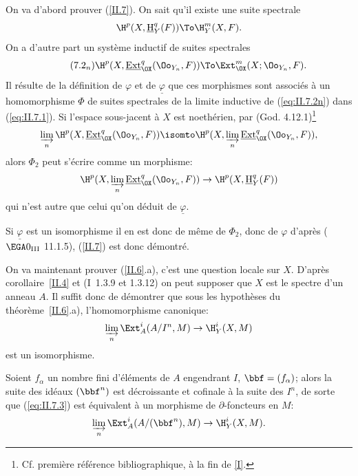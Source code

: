 On va d'abord prouver (\ref{II.7}). On sait qu'il existe une suite spectrale
\begin{equation} \label{eq:II.7.1}
\H^p(X, {\mathop{\underline{\mathrm{H}}}\nolimits}_Y^q(F)) \To \H_Y^{m}(X, F).
\end{equation}
On a d'autre part un syst\`eme inductif de suites spectrales
\begin{equation*} \label{eq:II.7.2n} \tag{7.2$_n$}
\H^p(X, {\mathop{\underline{\mathrm{Ext}}}\nolimits}_{\OX}^q(\Oo_{Y_n}, F)) \To \Ext_{\OX}^{m}(X;\Oo_{Y_n}, F).
\end{equation*}
Il r\'esulte de la d\'efinition de $\varphi$ et de $\underline{\varphi}$ que ces morphismes sont associ\'es \`a un homomorphisme $\Phi$ de suites spectrales de la limite inductive de (\ref{eq:II.7.2n}) dans (\ref{eq:II.7.1}). Si l'espace sous-jacent \`a $X$ est noeth\'erien, par (God. 4.12.1)\footnote{Cf. premi\`ere r\'ef\'erence bibliographique, \`a la fin de \Exp \ref{I}.}
\begin{equation*}
\varinjlim_{n} \H^p(X, {\mathop{\underline{\mathrm{Ext}}}\nolimits}_{\OX}^q(\Oo_{Y_n}, F))\isomto \H^p(X, \varinjlim_{n} {\mathop{\underline{\mathrm{Ext}}}\nolimits}_{\OX}^q(\Oo_{Y_n}, F)),
\end{equation*}
alors $\Phi_2$ peut s'\'ecrire comme un morphisme:
\begin{equation*} \H^p(X, \varinjlim_{n} {\mathop{\underline{\mathrm{Ext}}}\nolimits}_{\OX}^q(\Oo_{Y_n}, F)) \to \H^p(X, {\mathop{\underline{\mathrm{H}}}\nolimits}_Y^q(F))
\end{equation*}
qui n'est autre que celui qu'on d\'eduit de $\underline{\varphi}$.

Si $\underline{\varphi}$ est un isomorphisme il en est donc de m\^eme de $\Phi_2$, donc de $\varphi$ d'apr\`es ($\EGA 0_{\textup{III}}$ 11.1.5), (\ref{II.7}) est donc d\'emontr\'e.

On va maintenant prouver (\ref{II.6}.a), c'est une question locale sur $X$. D'apr\`es \ignorespaces corollaire~\ref{II.4} et (\EGA I~1.3.9 et 1.3.12) on peut supposer que $X$ est le spectre d'un anneau $A$. Il suffit donc de d\'emontrer que sous les hypoth\`eses du th\'eor\`eme~\ref{II.6}.a), l'homomorphisme canonique:
\begin{equation} \label{eq:II.7.3} \varinjlim_{n} \Ext_A^i(A/I^n, M) \to \H_Y^i(X, M)
\end{equation}
est un isomorphisme.

Soient $f_{\alpha}$ un nombre fini d'\'el\'ements de $A$ engendrant $I$, $\bbf=(f_{\alpha})$; alors la suite des id\'eaux $(\bbf^n)$ est d\'ecroissante et cofinale \`a la suite des $I^n$, de sorte que (\ref{eq:II.7.3}) est \'equivalent \`a un morphisme de $\partial$-foncteurs en $M$:
\begin{equation} \label{eq:II.7.4} \varinjlim_{n} \Ext_A^i(A/(\bbf^n), M) \to \H_Y^i(X, M).
\end{equation}

